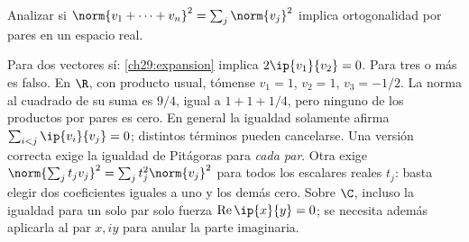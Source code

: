 \begin{ejercicio}\label{ej:lectura-29-2}
Analizar si $\norm{v_1+\cdots+v_n}^{2}=\sum_j\norm{v_j}^{2}$ implica ortogonalidad por pares en un espacio real.
\end{ejercicio}
\begin{solucion}
Para dos vectores sí: \eqref{ch29:expansion} implica $2\ip{v_1}{v_2}=0$. Para tres o más es falso. En $\R$, con producto usual, tómense $v_1=1$, $v_2=1$, $v_3=-1/2$. La norma al cuadrado de su suma es $9/4$, igual a $1+1+1/4$, pero ninguno de los productos por pares es cero. En general la igualdad solamente afirma $\sum_{i<j}\ip{v_i}{v_j}=0$; distintos términos pueden cancelarse. Una versión correcta exige la igualdad de Pitágoras para \emph{cada par}. Otra exige $\norm{\sum_j t_jv_j}^{2}=\sum_j t_j^{2}\norm{v_j}^{2}$ para todos los escalares reales $t_j$: basta elegir dos coeficientes iguales a uno y los demás cero. Sobre $\C$, incluso la igualdad para un solo par solo fuerza $\operatorname{Re}\ip{x}{y}=0$; se necesita además aplicarla al par $x,iy$ para anular la parte imaginaria.
\end{solucion}

